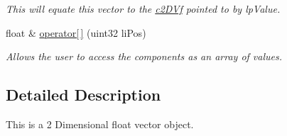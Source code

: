 \begin{DoxyCompactItemize}
\begin{DoxyCompactList}\small\item\em This will equate this vector to the \hyperlink{classc2_d_vf}{c2DVf} pointed to by lpValue. \end{DoxyCompactList}\item 
\hypertarget{classc2_d_vf_a8599a850a1a8df8ed3d0838615eaef0a}{
float \& \hyperlink{classc2_d_vf_a8599a850a1a8df8ed3d0838615eaef0a}{operator\mbox{[}$\,$\mbox{]}} (uint32 liPos)}
\label{classc2_d_vf_a8599a850a1a8df8ed3d0838615eaef0a}

\begin{DoxyCompactList}\small\item\em Allows the user to access the components as an array of values. \end{DoxyCompactList}\end{DoxyCompactItemize}


\subsection{Detailed Description}
This is a 2 Dimensional float vector object. 